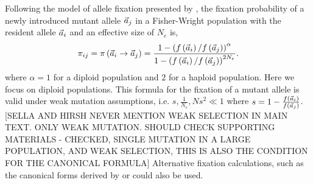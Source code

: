 Following the model of allele fixation presented by \citet{SellaHirsh2005}, the fixation probability of a newly introduced mutant allele $\vec{a}_j$ in a Fisher-Wright population with the resident allele $\vec{a}_i$ and an effective size of $N_e$ is,
\begin{equation}
\pi_{ij} = \pi\left(\vec{a}_i \to \vec{a}_j \right) = \frac{1-\left(f\left(\vec{a}_i\right)/f\left(\vec{a}_j\right)\right)^\alpha}{1-\left(f\left(\vec{a}_i\right)/f\left(\vec{a}_j\right)\right)^{2N_e}}.
\label{eq:fixation}
\end{equation}
where $\alpha = 1$ for a diploid population and $2$ for a haploid population.
Here we focus on diploid populations.
This formula for the fixation of a mutant allele is valid under weak mutation assumptions, i.e. $s, \frac{1}{N_e}, Ns^2 \ll 1$ where $s=1-\frac{f(\vec{a}_i)}{f(\vec{a}_j)}$.[SELLA AND HIRSH NEVER MENTION WEAK SELECTION IN MAIN TEXT. ONLY WEAK MUTATION. SHOULD CHECK SUPPORTING MATERIALS - {\color{blue} CHECKED, SINGLE MUTATION IN A LARGE POPULATION, AND WEAK SELECTION, THIS IS ALSO THE CONDITION FOR THE CANONICAL FORMULA}] %
Alternative fixation calculations, such as the canonical forms derived by \citet{fisher1930theory, wright1931evolution,moran1962statistical} or \citet{kimura1962probability} could also be used. 

%
%




